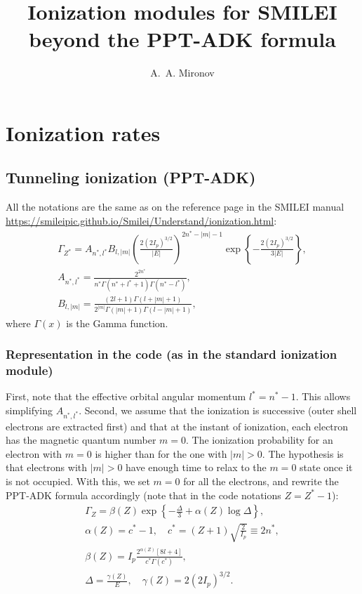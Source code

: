 \documentclass[prd, preprint,
aps,
amsmath,
amssymb,
onecolumn,
nofootinbib,
superscriptaddress,
]{revtex4-2}
\begin{document}
 
	
	\title{Ionization modules for SMILEI beyond the PPT-ADK formula}
	
	\author{A.~A. Mironov}
	
	\maketitle
	
	\section{Ionization rates}
	\subsection{Tunneling ionization (PPT-ADK)}
	All the notations are the same as on the reference page in the SMILEI manual \url{https://smileipic.github.io/Smilei/Understand/ionization.html}:
	\begin{gather}
		\label{PPT_definition}
		\Gamma_{Z^*}=A_{n^*,l^*} B_{l,|m|}\left( \frac{2(2I_p)^{3/2}}{|E|} \right)^{2n^*-|m|-1} \exp\left\lbrace -  \frac{2(2I_p)^{3/2}}{3|E|}\right\rbrace,\\
		A_{n^*,l^*} = \frac{2^{2n^*}}{n^*\Gamma(n^*+l^*+1)\Gamma(n^*-l^*)},\\
		B_{l,|m|} = \frac{(2l+1)\Gamma(l+|m|+1)}{2^{|m|}\Gamma(|m|+1)\Gamma(l-|m|+1)},
	\end{gather}
	where $\Gamma(x)$ is the Gamma function.
	
	\subsubsection{Representation in the code (as in the standard ionization module)}
	
	First, note that the effective orbital angular momentum $l^*=n^*-1$. This allows simplifying $A_{n^*,l^*}$. Second, we assume that the ionization is successive (outer shell electrons are extracted first) and that at the instant of ionization, each electron has the magnetic quantum number $m=0$. The ionization probability for an electron with $m=0$ is higher than for the one with $|m|>0$. The hypothesis is that electrons with $|m|>0$ have enough time to relax to the $m=0$ state once it is not occupied. With this, we set $m=0$ for all the electrons, and rewrite the PPT-ADK formula accordingly (note that in the code notations $Z=Z^*-1$):
	\begin{gather}
		\label{tunnel}
		\Gamma_{Z}=\beta(Z)\exp\left\lbrace -\frac{\Delta}{3} + \alpha(Z)\log\Delta \right\rbrace,\\
		\alpha(Z) = c^*-1,\quad c^*=(Z+1)\sqrt{\frac{2}{I_p}} \equiv 2n^*,\\
		\beta(Z) = I_p\frac{2^{\alpha(Z)} \left[ 8l+4 \right]}{c^*\Gamma(c^*)} ,\\
		\label{gamma_Delta}
		\Delta = \frac{\gamma(Z)}{E}, \quad \gamma(Z)=2(2I_p)^{3/2}. 
	\end{gather}
	
\end{document}
